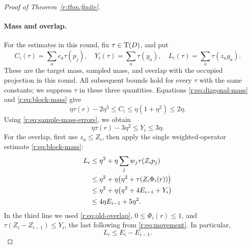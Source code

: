 \begin{proof}[Proof of Theorem~\ref{r:thm:finite}]
\paragraph{Mass and overlap.}
For the estimates in this round, fix \(\tau\in\operatorname T(D)\), and put
\[
 C_i(\tau)=\sum_a c_a\tau(p_j),\quad
 Y_i(\tau)=\sum_a\tau(y_a),\quad
 L_i(\tau)=\sum_a\tau(z_ay_a).
\]
These are the target mass, sampled mass, and overlap with the occupied
projection in this round. All subsequent bounds hold for every \(\tau\)
with the same constants; we suppress \(\tau\) in these three quantities.
Equations \eqref{r:eq:diagonal-mass} and \eqref{r:eq:block-mass} give
\[
 \eta\tau(r)-2\eta^3\leq C_i\leq\eta(1+\eta^2)\leq2\eta.
\]
Using \eqref{r:eq:sample-mass-errors}, we obtain
\begin{equation}\label{r:eq:round-mass}
 \eta\tau(r)-3\eta^2\leq Y_i\leq3\eta.
\end{equation}
For the overlap, first use \(z_a\leq Z_i\), then apply the single
weighted-operator estimate \eqref{r:eq:block-mass}:
\begin{align}
 L_i
 &\leq\eta^2+\eta\sum_jw_j\tau(Z_ip_j)\notag\\
 &\leq\eta^2+\eta\big(\eta^2+\tau(Z_i\Phi_i(r))\big)\notag\\
 &\leq\eta^2+\eta\big(\eta^2+4E_{i-1}+Y_i\big)\notag\\
 &\leq4\eta E_{i-1}+5\eta^2.
 \label{r:eq:round-overlap}
\end{align}
In the third line we used \eqref{r:eq:old-overlap},
\(0\leq\Phi_i(r)\leq1\), and
\(\tau(Z_i-Z_{i-1})\leq Y_i\), the last following from
\eqref{r:eq:movement}.
In particular,
\begin{equation}\label{r:eq:overlap-summable}
 L_i\leq E_i-E_{i-1}.
\end{equation}


\end{proof}
